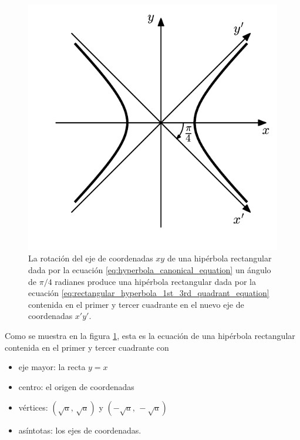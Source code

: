 \documentclass[a4paper]{report}
\begin{document}
\begin{figure}[!htb]
  \begin{minipage}[c]{0.45\textwidth}
    \includegraphics[width=\textwidth]{figuras/square_mapping_rotated_hyperbola.pdf}
  \end{minipage}\hfill
  \begin{minipage}[c]{0.45\textwidth}
    \caption{
       La rotación del eje de coordenadas \(xy\) de una hipérbola rectangular dada por la ecuación \ref{eq:hyperbola_canonical_equation} un ángulo de \(\pi/4\) radianes produce una hipérbola rectangular dada por la ecuación \ref{eq:rectangular_hyperbola_1st_3rd_quadrant_equation} contenida en el primer y tercer cuadrante en el nuevo eje de coordenadas \(x'y'\).
    } \label{fig:square_mapping_rotated_hyperbola}
  \end{minipage}
\end{figure}
Como se muestra en la figura \ref{fig:square_mapping_rotated_hyperbola}, esta es la ecuación de una hipérbola rectangular contenida en el primer y tercer cuadrante con 
\begin{itemize}
 \item eje mayor: la recta \(y=x\)
 \item centro: el origen de coordenadas
 \item vértices: \((\sqrt{a},\,\sqrt{a})\) y \((-\sqrt{a},\,-\sqrt{a})\)
 \item asíntotas: los ejes de coordenadas.
\end{itemize}
\end{document}
